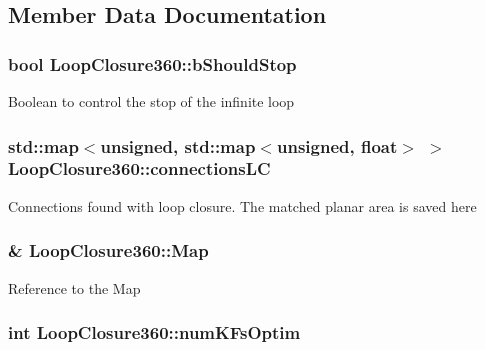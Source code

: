 \subsection{Member Data Documentation}
\hypertarget{classLoopClosure360_a3938681e7058a95a39cadc723388f1ad}{
\subsubsection[{b\-Should\-Stop}]{\setlength{\rightskip}{0pt plus 5cm}bool Loop\-Closure360\-::b\-Should\-Stop\hspace{0.3cm}{\ttfamily [private]}}}\label{classLoopClosure360_a3938681e7058a95a39cadc723388f1ad}
Boolean to control the stop of the infinite loop \hypertarget{classLoopClosure360_aadd883360701f7c73c1d050a57349037}{
\subsubsection[{connections\-L\-C}]{\setlength{\rightskip}{0pt plus 5cm}std\-::map$<$unsigned, std\-::map$<$unsigned, float$>$ $>$ Loop\-Closure360\-::connections\-L\-C}}\label{classLoopClosure360_aadd883360701f7c73c1d050a57349037}
Connections found with loop closure. The matched planar area is saved here \hypertarget{classLoopClosure360_a5b91cac06bfd29812943dfd042081e62}{
\subsubsection[{Map}]{\& Loop\-Closure360\-::\-Map\hspace{0.3cm}{\ttfamily [private]}}}\label{classLoopClosure360_a5b91cac06bfd29812943dfd042081e62}
Reference to the Map \hypertarget{classLoopClosure360_a5382c470b13df15c7e47c8d096c7d32f}{
\subsubsection[{num\-K\-Fs\-Optim}]{\setlength{\rightskip}{0pt plus 5cm}int Loop\-Closure360\-::num\-K\-Fs\-Optim\hspace{0.3cm}{\ttfamily [private]}}}\label{classLoopClosure360_a5382c470b13df15c7e47c8d096c7d32f}
